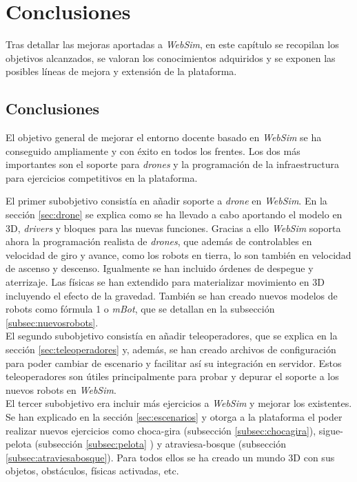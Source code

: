 \chapter{Conclusiones}
\label{chap:conclusiones}

Tras detallar las mejoras aportadas a \textit{WebSim}, en este capítulo se recopilan los objetivos alcanzados, se valoran los conocimientos adquiridos y se exponen las posibles líneas de mejora y extensión de la plataforma. 

\section{Conclusiones}
\label{sec:conclusiones}
El objetivo general de mejorar el entorno docente basado en \textit{WebSim} se ha conseguido ampliamente y con éxito en todos los frentes. Los dos más importantes son el soporte para \textit{drones} y la programación de la infraestructura para ejercicios competitivos en la plataforma. 

El primer subobjetivo consistía en añadir soporte a \textit{drone} en \textit{WebSim}. En la sección \ref{sec:drone} se explica como se ha llevado a cabo aportando el modelo en 3D, \textit{drivers} y bloques para las nuevas funciones. Gracias a ello \textit{WebSim} soporta ahora la programación realista de \textit{drones}, que además de controlables en velocidad de giro y avance, como los robots en tierra, lo son también en velocidad de ascenso y descenso. Igualmente se han incluido órdenes de despegue y aterrizaje. Las físicas se han extendido para materializar movimiento en 3D incluyendo el efecto de la gravedad. También se han creado nuevos modelos de robots como fórmula 1 o \textit{mBot}, que se detallan en la subsección \ref{subsec:nuevosrobots}.\\

El segundo subobjetivo consistía en añadir teleoperadores, que se explica en la sección \ref{sec:teleoperadores} y, además, se han creado archivos de configuración para poder cambiar de escenario y facilitar así su integración en servidor. Estos teleoperadores son útiles principalmente para probar y depurar el soporte a los nuevos robots en \textit{WebSim}.\\

El tercer subobjetivo era incluir más ejercicios a \textit{WebSim} y mejorar los existentes. Se han explicado en la sección \ref{sec:escenarios} y otorga a la plataforma el poder realizar nuevos ejercicios como choca-gira (subsección \ref{subsec:chocagira}), sigue-pelota (subsección \ref{subsec:pelota} ) y atraviesa-bosque (subsección \ref{subsec:atraviesabosque}).  Para todos ellos se ha creado un mundo 3D con sus objetos, obstáculos, físicas activadas, etc. \\

